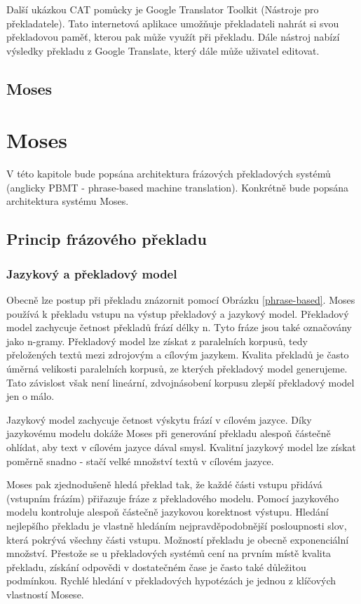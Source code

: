 \documentclass[12pt,a4paper]{report}
\begin{document}
Další ukázkou CAT pomůcky je Google Translator Toolkit (Nástroje pro překladatele). Tato internetová aplikace umožňuje překladateli nahrát si svou překladovou paměť, kterou pak může využít při překladu. Dále nástroj nabízí výsledky překladu z Google Translate, který dále může uživatel editovat.

\section{Moses}

\chapter{Moses}

V této kapitole bude popsána architektura frázových překladových systémů (anglicky PBMT - phrase-based machine translation). Konkrétně bude popsána architektura systému Moses.

\section{Princip frázového překladu}

\subsection{Jazykový a překladový model}
Obecně lze postup při překladu znázornit pomocí Obrázku \ref{phrase-based}. Moses používá k překladu vstupu na výstup překladový a jazykový model. Překladový model zachycuje četnost překladů frází délky n. Tyto fráze jsou také označovány jako n-gramy. Překladový model lze získat z paralelních korpusů, tedy přeložených textů mezi zdrojovým a cílovým jazykem. Kvalita překladů je často úměrná velikosti paralelních korpusů, ze kterých překladový model generujeme. Tato závislost však není lineární, zdvojnásobení korpusu zlepší překladový model jen o málo.

Jazykový model zachycuje četnost výskytu frází v cílovém jazyce. Díky jazykovému modelu dokáže Moses při generování překladu alespoň částečně ohlídat, aby text v cílovém jazyce dával smysl. Kvalitní jazykový model lze získat poměrně snadno - stačí velké množství textů v cílovém jazyce.

Moses pak zjednodušeně hledá překlad tak, že každé části vstupu přidává (vstupním frázím) přiřazuje fráze z překladového modelu. Pomocí jazykového modelu kontroluje alespoň částečně jazykovou korektnost výstupu. Hledání nejlepšího překladu je vlastně hledáním nejpravděpodobnější posloupnosti slov, která pokrývá všechny části vstupu. Možností překladu je obecně exponenciální množství. Přestože se u překladových systémů cení na prvním místě kvalita překladu, získání odpovědi v dostatečném čase je často také důležitou podmínkou. Rychlé hledání v překladových hypotézách je jednou z klíčových vlastností Mosese.
\end{document}
